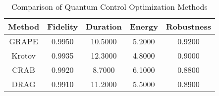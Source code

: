 \begin{table}[h]
\centering
\begin{tabular}{|c|c|c|c|c|}
\hline
\textbf{Method} & \textbf{Fidelity} & \textbf{Duration} & \textbf{Energy} & \textbf{Robustness} \\
\hline
GRAPE & 0.9950 & 10.5000 & 5.2000 & 0.9200 \\
Krotov & 0.9935 & 12.3000 & 4.8000 & 0.9000 \\
CRAB & 0.9920 & 8.7000 & 6.1000 & 0.8800 \\
DRAG & 0.9910 & 11.2000 & 5.5000 & 0.8900 \\
\hline
\end{tabular}
\caption{Comparison of Quantum Control Optimization Methods}
\label{tab:method_comparison}
\end{table}